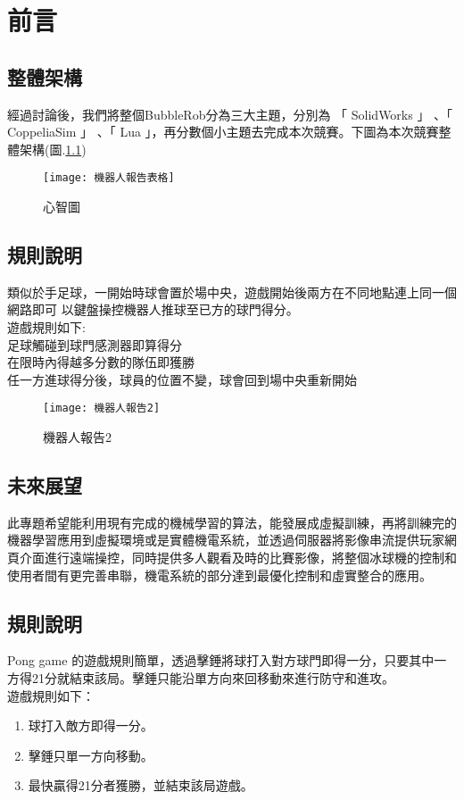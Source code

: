 \chapter{前言}
\renewcommand{\baselinestretch}{10.0} %
\setcounter{page}{1}  %
\fontsize{14pt}{2.5pt}\sectionef
\section{整體架構}
    經過討論後，我們將整個BubbleRob分為三大主題，分別為 「 SolidWorks 」 、「 CoppeliaSim 」 、「 Lua 」，再分數個小主題去完成本次競賽。下圖為本次競賽整體架構(圖.\ref{fig.機器人報告表格})\\

\begin{figure}[hbt!]
\begin{center}
\texttt{[image: 機器人報告表格]}
\caption{\Large 心智圖}\label{fig.機器人報告表格}
\end{center}
\end{figure}


\section{規則說明}
類似於手足球，一開始時球會置於場中央，遊戲開始後兩方在不同地點連上同一個網路即可
以鍵盤操控機器人推球至已方的球門得分。\\
 
遊戲規則如下:\\

足球觸碰到球門感測器即算得分\\
在限時內得越多分數的隊伍即獲勝\\
任一方進球得分後，球員的位置不變，球會回到場中央重新開始\\
\begin{figure}[hbt!]
\begin{center}
\texttt{[image: 機器人報告2]}
\caption{\Large 機器人報告2 }
\label{機器人報告2 }
\end{center}
\end{figure}
\section{未來展望}
此專題希望能利用現有完成的機械學習的算法，能發展成虛擬訓練，再將訓練完的機器學習應用到虛擬環境或是實體機電系統，並透過伺服器將影像串流提供玩家網頁介面進行遠端操控，同時提供多人觀看及時的比賽影像，將整個冰球機的控制和使用者間有更完善串聯，機電系統的部分達到最優化控制和虛實整合的應用。
\section{規則說明}
 Pong game 的遊戲規則簡單，透過擊錘將球打入對方球門即得一分，只要其中一方得21分就結束該局。擊錘只能沿單方向來回移動來進行防守和進攻。\\
遊戲規則如下：
\begin{enumerate}
\item 球打入敵方即得一分。
\item 擊錘只單一方向移動。
\item 最快贏得21分者獲勝，並結束該局遊戲。
\end{enumerate}

\renewcommand{\baselinestretch}{0.5} %